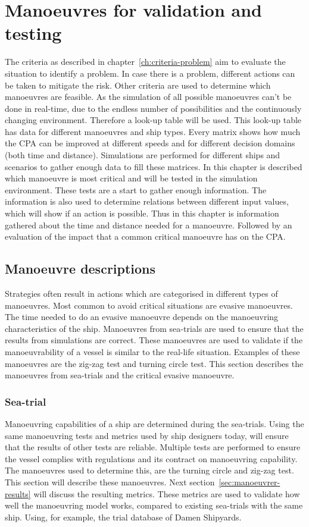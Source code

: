 \chapter{Manoeuvres for validation and testing}
\label{ch:criteria-manouvre}
The criteria as described in chapter~\ref{ch:criteria-problem} aim to evaluate the situation to identify a problem. In case there is a problem, different actions can be taken to mitigate the risk. Other criteria are used to determine which manoeuvres are feasible. As the simulation of all possible manoeuvres can't be done in real-time, due to the endless number of possibilities and the continuously changing environment. Therefore a look-up table will be used. This look-up table has data for different manoeuvres and ship types. Every matrix shows how much the CPA can be improved at different speeds and for different decision domains (both time and distance).
Simulations are performed for different ships and scenarios to gather enough data to fill these matrices. In this chapter is described which manoeuvre is most critical and will be tested in the simulation environment. These tests are a start to gather enough information. The information is also used to determine relations between different input values, which will show if an action is possible. Thus in this chapter is information gathered about the time and distance needed for a manoeuvre. Followed by an evaluation of the impact that a common critical manoeuvre has on the CPA.

\section{Manoeuvre descriptions}
\label{sec:manoeuvrer-description}
Strategies often result in actions which are categorised in different types of manoeuvres. Most common to avoid critical situations are evasive manoeuvres. The time needed to do an evasive manoeuvre depends on the manoeuvring characteristics of the ship. Manoeuvres from sea-trials are used to ensure that the results from simulations are correct. These manoeuvres are used to validate if the manoeuvrability of a vessel is similar to the real-life situation. Examples of these manoeuvres are the zig-zag test and turning circle test. This section describes the manoeuvres from sea-trials and the critical evasive manoeuvre.

\subsection{Sea-trial}
Manoeuvring capabilities of a ship are determined during the sea-trials. Using the same manoeuvring tests and metrics used by ship designers today, will ensure that the results of other tests are reliable. Multiple tests are performed to ensure the vessel complies with regulations and its contract on manoeuvring capability. The manoeuvres used to determine this, are the turning circle and zig-zag test. This section will describe these manoeuvres. Next section~\ref{sec:manoeuvrer-results} will discuss the resulting metrics. These metrics are used to validate how well the manoeuvring model works, compared to existing sea-trials with the same ship. Using, for example, the trial database of Damen Shipyards.

